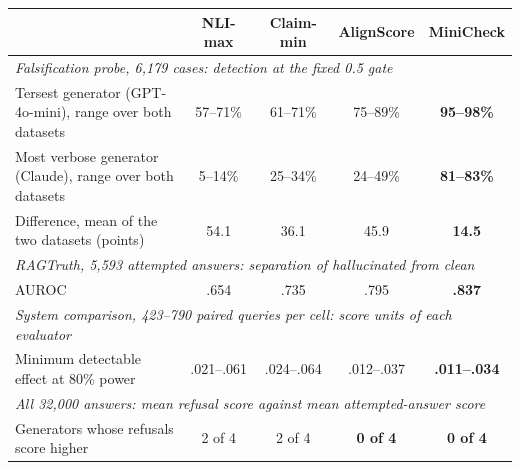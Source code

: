 \label{sec:choosing}

\begin{table}[t]
\centering\small
\begin{tabular}{lcccc}
\toprule
 & \textbf{NLI-max} & \textbf{Claim-min} & \textbf{AlignScore} & \textbf{MiniCheck} \\
\midrule
\multicolumn{5}{l}{\emph{Falsification probe, 6,179 cases: detection at the fixed 0.5 gate}} \\
\quad Tersest generator (GPT-4o-mini), range over both datasets & 57--71\% & 61--71\% & 75--89\% & \textbf{95--98\%} \\
\quad Most verbose generator (Claude), range over both datasets & 5--14\% & 25--34\% & 24--49\% & \textbf{81--83\%} \\
\quad Difference, mean of the two datasets (points) & 54.1 & 36.1 & 45.9 & \textbf{14.5} \\
\midrule
\multicolumn{5}{l}{\emph{RAGTruth, 5,593 attempted answers: separation of hallucinated from clean}} \\
\quad AUROC & .654 & .735 & .795 & \textbf{.837} \\
\midrule
\multicolumn{5}{l}{\emph{System comparison, 423--790 paired queries per cell: score units of each evaluator}} \\
\quad Minimum detectable effect at 80\% power & .021--.061 & .024--.064 & .012--.037 & \textbf{.011--.034} \\
\midrule
\multicolumn{5}{l}{\emph{All 32,000 answers: mean refusal score against mean attempted-answer score}} \\
\quad Generators whose refusals score higher & 2 of 4 & 2 of 4 & \textbf{0 of 4} & \textbf{0 of 4} \\
\bottomrule
\end{tabular}

\end{table}
